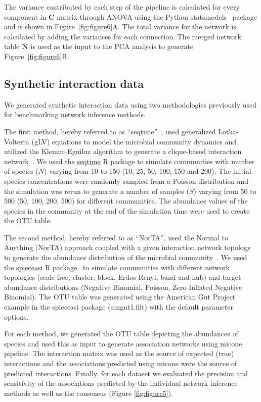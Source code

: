    The variance contributed by each step of the pipeline is calculated for every component in $\mathbf{C}$ matrix through ANOVA using the Python statsmodels~\cite{seaboldStatsmodelsEconometricStatistical2010} package and is shown in Figure~\ref{fig:figure6}A.
  The total variance for the network is calculated by adding the variances for each connection.
  The merged network table $\mathbf{\bar{N}}$ is used as the input to the PCA analysis to generate Figure~\ref{fig:figure6}B.

  \subsection*{Synthetic interaction data}
  \vspace{-5mm}
  We generated synthetic interaction data using two methodologies previously used for benchmarking network inference methods.

  The first method, hereby referred to as ``seqtime''~\cite{faustSignaturesEcologicalProcesses2018}, used generalized Lotka-Volterra (gLV) equations to model the microbial community dynamics and utilized the Klemm–Eguı́luz algorithm to generate a clique-based interaction network~\cite{Rottjers2018}.
  We used the \href{https://github.com/hallucigenia-sparsa/seqtime}{seqtime} R package to simulate communities with number of species ($N$) varying from 10 to 150 (10, 25, 50, 100, 150 and 200).
  The initial species concentrations were randomly sampled from a Poisson distribution and the simulation was rerun to generate a number of samples ($S$) varying from 50 to 500 (50, 100, 200, 500) for different communities.
  The abundance values of the species in the community at the end of the simulation time were used to create the OTU table.

  The second method, hereby referred to as ``NorTA'', used the Normal to Anything (NorTA) approach coupled with a given interaction network topology to generate the abundance distribution of the microbial community~\cite{Kurtz2015}.
  We used the \href{https://github.com/zdk123/SpiecEasi}{spieceasi} R package~\cite{Kurtz2015} to simulate communities with different network topologies (scale-free, cluster, block, Erdos-Renyi, band and hub) and target abundance distributions (Negative Binomial, Poisson, Zero-Inflated Negative Binomial).
  The OTU table was generated using the American Gut Project example in the spieceasi package (amgut1.filt) with the default parameter options.

  For each method, we generated the OTU table depicting the abundances of species and used this as input to generate association networks using \ac{micone} pipeline.
  The interaction matrix was used as the source of expected (true) interactions and the associations predicted using \ac{micone} were the source of predicted interactions.
  Finally, for each dataset we evaluated the precision and sensitivity of the associations predicted by the individual network inference methods as well as the consensus (Figure \ref{fig:figure5}).

